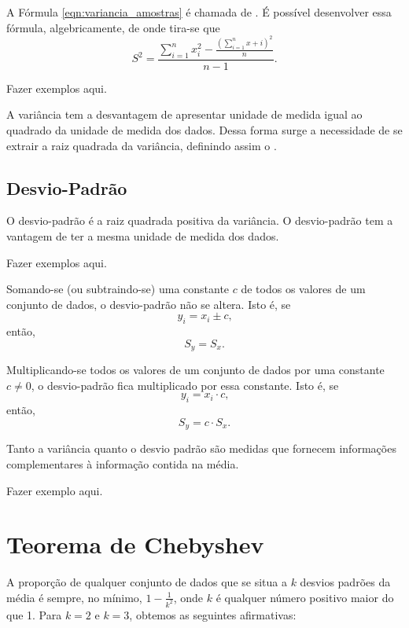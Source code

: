 \documentclass[11pt,fleqn]{book}
\numberwithin{mpicture}{chapter}
\numberwithin{mtable}{chapter}
\numberwithin{mframe}{chapter}
\begin{document}
A Fórmula \ref{eqn:variancia_amostras} é chamada de . É possível desenvolver essa fórmula, algebricamente, de onde tira-se que
\[
	S^2=\frac{
		\displaystyle \sum_{i=1}^{n} x_i^2
		-
		\displaystyle \frac{
			\left (
				\displaystyle \sum_{i=1}^{n} x+i
			\right ) ^2
		}{n}
	} {
		n-1
	}
	\text{.}
\]

{\color{red}Fazer exemplos aqui.}

A variância tem a desvantagem de apresentar unidade de medida igual ao quadrado da unidade de medida dos dados. Dessa forma surge a necessidade de se extrair a raiz quadrada da variância, definindo assim o .

\subsection{Desvio-Padrão}

O desvio-padrão é a raiz quadrada positiva da variância. O desvio-padrão tem a vantagem de ter a mesma unidade de  medida dos dados.

{\color{red}Fazer exemplos aqui.}

\begin{theorem}
	Somando-se (ou subtraindo-se) uma constante $c$ de todos os valores de um conjunto de dados, o desvio-padrão não se altera. Isto é, se
	\[
		y_i=x_i\pm c\text{,}
	\]
	então,
	\[
		S_y=S_x\text{.}
	\]
\end{theorem}

\begin{theorem}
	Multiplicando-se todos os valores de um conjunto de dados por uma constante $c\neq 0$, o desvio-padrão fica multiplicado por essa constante. Isto é, se
	\[
		y_i=x_i\cdot c\text{,}
	\]
	então,
	\[
		S_y=c\cdot S_x\text{.}
	\]
\end{theorem}

Tanto a variância quanto o desvio padrão são medidas que fornecem informações complementares à informação contida na média.

{\color{red}Fazer exemplo aqui.}

\section{Teorema de Chebyshev}

A proporção de qualquer conjunto de dados que se situa a $k$ desvios padrões da média é sempre, no mínimo, $1-\frac{1}{k^2}$, onde $k$ é qualquer número positivo maior do que 1. Para $k=2$ e $k=3$, obtemos as seguintes afirmativas:
\end{document}
